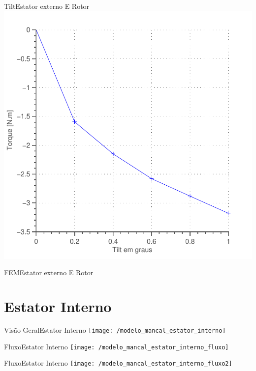 \documentclass{beamer}
\begin{document}
\begin{frame}{Tilt}{Estator externo E Rotor}
\centering
\includegraphics[width=0.7\linewidth]{Simulacoes/Passivo2/fem/passivo_otimizado_fem_tilt}
\end{frame}

\begin{frame}{FEM}{Estator externo E Rotor}
\begin{center}

\end{center}

\end{frame}

\section{Estator Interno}

\begin{frame}{Visão Geral}{Estator Interno}
	\texttt{[image: /modelo\_mancal\_estator\_interno]}
\end{frame}


\begin{frame}{Fluxo}{Estator Interno}
\centering
 	\texttt{[image: /modelo\_mancal\_estator\_interno\_fluxo]}
\end{frame}

\begin{frame}{Fluxo}{Estator Interno}
\centering
 	\texttt{[image: /modelo\_mancal\_estator\_interno\_fluxo2]}
\end{frame}
\end{document}
